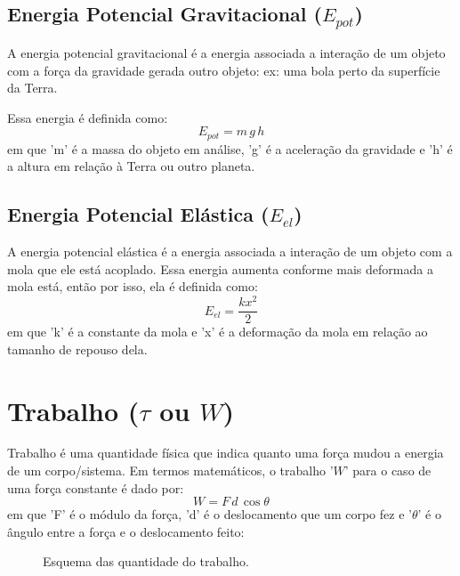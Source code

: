 \documentclass[12pt]{extarticle}
\newcommand{\<}{\langle}
\renewcommand{\>}{\rangle}
\theoremstyle{definition}
\begin{document}
\subsection{Energia Potencial Gravitacional ($E_{pot}$)}
A energia potencial gravitacional é a energia associada a interação de um objeto com a força da gravidade gerada outro objeto: ex: uma bola perto da superfície da Terra.

Essa energia é definida como:
\begin{equation}
    E_{pot} = m\,g\,h
\end{equation}
\noindent em que 'm' é a massa do objeto em análise, 'g' é a aceleração da gravidade e 'h' é a altura em relação à Terra ou outro planeta.

\subsection{Energia Potencial Elástica ($E_{el}$)}
A energia potencial elástica é a energia associada a interação de um objeto com a mola que ele está acoplado. Essa energia aumenta conforme mais deformada a mola está, então por isso, ela é definida como:
\begin{equation}
    E_{el} = \frac{kx^2}{2}
\end{equation}
\noindent em que 'k' é a constante da mola e 'x' é a deformação da mola em relação ao tamanho de repouso dela.

\section{Trabalho ($\tau$ ou $W$)}
Trabalho é uma quantidade física que indica quanto uma força mudou a energia de um corpo/sistema. Em termos matemáticos, o trabalho '$W$' para o caso de uma força constante é dado por:
\begin{equation}
    W = F\,d\,\cos\theta
\end{equation}
\noindent em que 'F' é o módulo da força, 'd' é o deslocamento que um corpo fez e '$\theta$' é o ângulo entre a força e o deslocamento feito:

\begin{figure}[H]
    \centering
    \caption{Esquema das quantidade do trabalho.}
    \label{fig:trabalho}
\end{figure}
\end{document}
